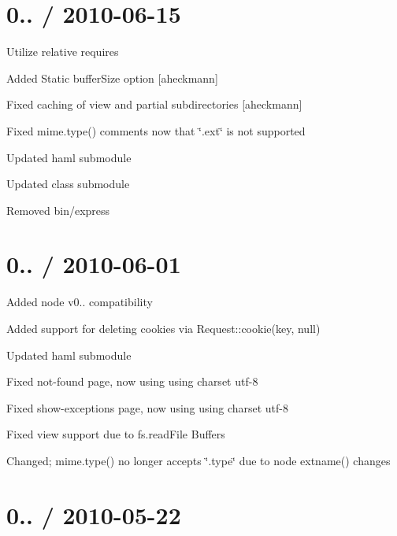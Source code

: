 {\ttfamily \section*{0.. / 2010-\/06-\/15 }}

{\ttfamily }

{\ttfamily 
\begin{DoxyItemize}
\item Utilize relative requires
\item Added Static buffer\+Size option \mbox{[}aheckmann\mbox{]}
\item Fixed caching of view and partial subdirectories \mbox{[}aheckmann\mbox{]}
\item Fixed mime.\+type() comments now that \char`\"{}.\+ext\char`\"{} is not supported
\item Updated haml submodule
\item Updated class submodule
\item Removed bin/express
\end{DoxyItemize}}

{\ttfamily \section*{0.. / 2010-\/06-\/01 }}

{\ttfamily }

{\ttfamily 
\begin{DoxyItemize}
\item Added node v0.. compatibility
\item Added support for deleting cookies via Request\+::cookie(\textquotesingle{}key\textquotesingle{}, null)
\item Updated haml submodule
\item Fixed not-\/found page, now using using charset utf-\/8
\item Fixed show-\/exceptions page, now using using charset utf-\/8
\item Fixed view support due to fs.\+read\+File Buffers
\item Changed; mime.\+type() no longer accepts \char`\"{}.\+type\char`\"{} due to node extname() changes
\end{DoxyItemize}}

{\ttfamily \section*{0.. / 2010-\/05-\/22 }}

{\ttfamily }

